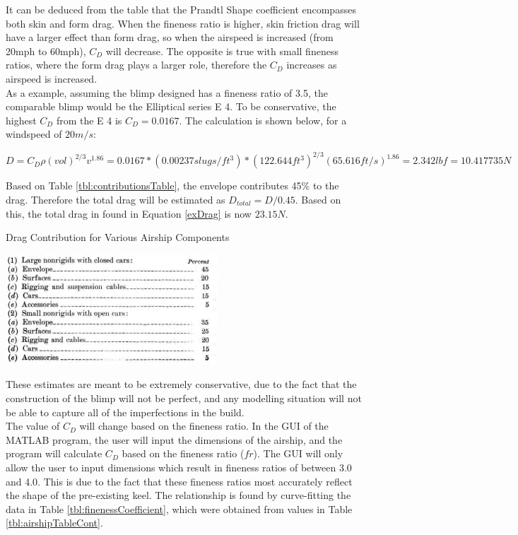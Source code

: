\documentclass[../main.tex]{subfiles}
\begin{document}
It can be deduced from the table that the Prandtl Shape coefficient encompasses both skin and form drag. When the fineness ratio is higher, skin friction drag will have a larger effect than form drag, so when the airspeed is increased (from 20mph to 60mph), $C_D$ will decrease. The opposite is true with small fineness ratios, where the form drag plays a larger role, therefore the $C_D$ increases as airspeed is increased. \\

As a example, assuming the blimp designed has a fineness ratio of 3.5, the comparable blimp would be the Elliptical series E 4. To be conservative, the highest $C_D$ from the E 4 is $C_D = 0.0167$. The calculation is shown below, for a windspeed of $20m/s$:

\begin{equation*} \label{exDrag}
D = C_D\rho (vol)^{2/3}v^{1.86}=0.0167*(0.00237 slugs/ft^3)*(122.644 ft^3)^{2/3}(65.616 ft/s) ^{1.86} = 2.342 lbf = 10.417735N 
\end{equation*}

Based on Table \ref{tbl:contributionsTable}, the envelope contributes 45\% to the drag. Therefore the total drag will be estimated as $D_{total}=D/0.45$. Based on this, the total drag in found in Equation \ref{exDrag} is now $23.15N$.

\begin{table}[H]
	\centering
	\caption{Drag Contribution for Various Airship Components \cite{airshipAerodynamics}}
	\includegraphics[width=.5\linewidth]{img/drag/contributions.PNG}
	\label{tbl:contributionsTable}
\end{table}

These estimates are meant to be extremely conservative, due to the fact that the construction of the blimp will not be perfect, and any modelling situation will not be able to capture all of the imperfections in the build.\\

The value of $C_D$ will change based on the fineness ratio. In the GUI of the MATLAB program, the user will input the dimensions of the airship, and the program will calculate $C_D$ based on the fineness ratio ($fr$). The GUI will only allow the user to input dimensions which result in fineness ratios of between 3.0 and 4.0. This is due to the fact that these fineness ratios most accurately reflect the shape of the pre-existing keel. The relationship is found by curve-fitting the data in Table \ref{tbl:finenessCoefficient}, which were obtained from values in Table \ref{tbl:airshipTableCont}.
\end{document}
